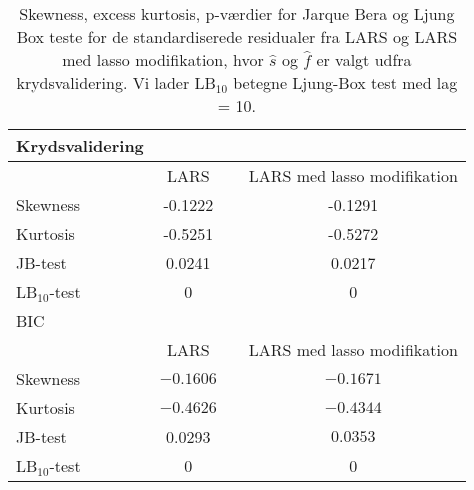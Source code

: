 \begin{table}
\center
\begin{tabular}{lccc} 
Krydsvalidering \\
\toprule
& LARS && LARS med lasso modifikation \\ \midrule
Skewness & -0.1222 && -0.1291   \\
Kurtosis & -0.5251  && -0.5272 \\
JB-test & 0.0241 &&  0.0217 \\
LB$_{10}$-test &0 && 0   \\  \bottomrule \toprule
BIC \\ \toprule
& LARS && LARS med lasso modifikation \\ \midrule
Skewness & $-0.1606$  && $-0.1671$    \\
Kurtosis &   $-0.4626$ && $-0.4344 $ \\
JB-test & 0.0293 &&  $0.0353$ \\
LB$_{10}$-test & 0 && 0  \\  \bottomrule 
\end{tabular}
\caption{Skewness, excess kurtosis, p-værdier for Jarque Bera og Ljung Box teste for de standardiserede residualer fra LARS og LARS med lasso modifikation, hvor  $\widehat{s}$ og $\widehat{f}$ er valgt udfra krydsvalidering. Vi lader LB$_{10}$ betegne Ljung-Box test med lag = 10. } \label{tab:lars_kryds_res_tab}
\end{table}